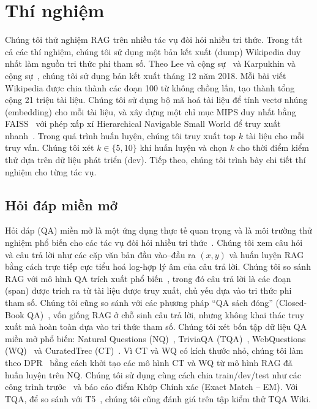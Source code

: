 \documentclass[10pt,letterpaper]{article}
\begin{document}
\section{Thí nghiệm}
Chúng tôi thử nghiệm RAG trên nhiều tác vụ đòi hỏi nhiều tri thức. Trong tất cả
các thí nghiệm, chúng tôi sử dụng một bản kết xuất (dump) Wikipedia duy nhất
làm nguồn tri thức phi tham số. Theo Lee và cộng sự~\cite{b31} và Karpukhin và
cộng sự~\cite{b26}, chúng tôi sử dụng bản kết xuất tháng 12 năm 2018. Mỗi bài
viết Wikipedia được chia thành các đoạn 100 từ không chồng lấn, tạo thành tổng
cộng 21 triệu tài liệu. Chúng tôi sử dụng bộ mã hoá tài liệu để tính vectơ
nhúng (embedding) cho mỗi tài liệu, và xây dựng một chỉ mục MIPS duy nhất bằng
FAISS~\cite{b23} với phép xấp xỉ Hierarchical Navigable Small World để truy
xuất nhanh~\cite{b37}. Trong quá trình huấn luyện, chúng tôi truy xuất top $k$
tài liệu cho mỗi truy vấn. Chúng tôi xét $k\in\{5,10\}$ khi huấn luyện và chọn
$k$ cho thời điểm kiểm thử dựa trên dữ liệu phát triển (dev). Tiếp theo, chúng
tôi trình bày chi tiết thí nghiệm cho từng tác vụ.

\subsection{Hỏi đáp miền mở}

Hỏi đáp (QA) miền mở là một ứng dụng thực tế quan trọng và là môi trường thử
nghiệm phổ biến cho các tác vụ đòi hỏi nhiều tri thức~\cite{b20}. Chúng tôi xem
câu hỏi và câu trả lời như các cặp văn bản đầu vào--đầu ra $(x,y)$ và huấn
luyện RAG bằng cách trực tiếp cực tiểu hoá log-hợp lý âm của câu trả lời. Chúng
tôi so sánh RAG với mô hình QA trích xuất phổ biến~\cite{b5,b7,b31,b26}, trong
đó câu trả lời là các đoạn (span) được trích ra từ tài liệu được truy xuất,
chủ yếu dựa vào tri thức phi tham số. Chúng tôi cũng so sánh với các phương
pháp ``QA sách đóng'' (Closed-Book QA)~\cite{b52}, vốn giống RAG ở chỗ sinh câu
trả lời, nhưng không khai thác truy xuất mà hoàn toàn dựa vào tri thức tham số.
Chúng tôi xét bốn tập dữ liệu QA miền mở phổ biến: Natural Questions
(NQ)~\cite{b29}, TriviaQA (TQA)~\cite{b24}, WebQuestions (WQ)~\cite{b3} và
CuratedTrec (CT)~\cite{b2}. Vì CT và WQ có kích thước nhỏ, chúng tôi làm theo
DPR~\cite{b26} bằng cách khởi tạo các mô hình CT và WQ từ mô hình RAG đã huấn
luyện trên NQ. Chúng tôi sử dụng cùng cách chia train/dev/test như các công
trình trước~\cite{b31,b26} và báo cáo điểm Khớp Chính xác (Exact Match -- EM).
Với TQA, để so sánh với T5~\cite{b52}, chúng tôi cũng đánh giá trên tập kiểm
thử TQA Wiki.
\end{document}
